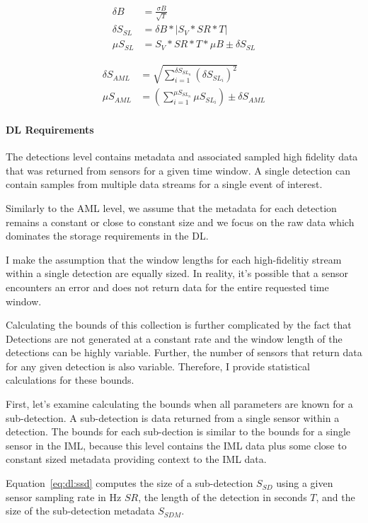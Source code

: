\begin{align}
	\delta B &= \frac{\sigma B}{\sqrt{T}} \\
	\delta S_{SL} &= \delta B * |S_{V} * SR * T| \\
	\mu S_{SL} &= S_{V} * SR * T * \mu B \pm \delta S_{SL}
\end{align}

\begin{align}
	\delta S_{AML} &= \sqrt{\sum_{i=1}^{\delta S_{SL_{n}}} (\delta S_{SL_{i}})^2} \\
	\mu S_{AML} &= (\sum_{i=1}^{\mu S_{SL_{n}}} \mu S_{SL_{i}}) \pm \delta S_{AML}
\end{align}

\paragraph{DL Requirements}
The detections level contains metadata and associated sampled high fidelity data that was returned from sensors for a given time window. A single detection can contain samples from multiple data streams for a single event of interest.

Similarly to the AML level, we assume that the metadata for each detection remains a constant or close to constant size and we focus on the raw data which dominates the storage requirements in the DL.

I make the assumption that the window lengths for each high-fidelitiy stream within a single detection are equally sized. In reality, it's possible that a sensor encounters an error and does not return data for the entire requested time window.

Calculating the bounds of this collection is further complicated by the fact that Detections are not generated at a constant rate and the window length of the detections can be highly variable. Further, the number of sensors that return data for any given detection is also variable. Therefore, I provide statistical calculations for these bounds.

First, let's examine calculating the bounds when all parameters are known for a sub-detection. A sub-detection is data returned from a single sensor within a detection. The bounds for each sub-dection is similar to the bounds for a single sensor in the IML, because this level contains the IML data plus some close to constant sized metadata providing context to the IML data.

Equation~\ref{eq:dl:ssd} computes the size of a sub-detection $S_{SD}$ using a given sensor sampling rate in Hz $SR$, the length of the detection in seconds $T$, and the size of the sub-detection metadata $S_{SDM}$.


